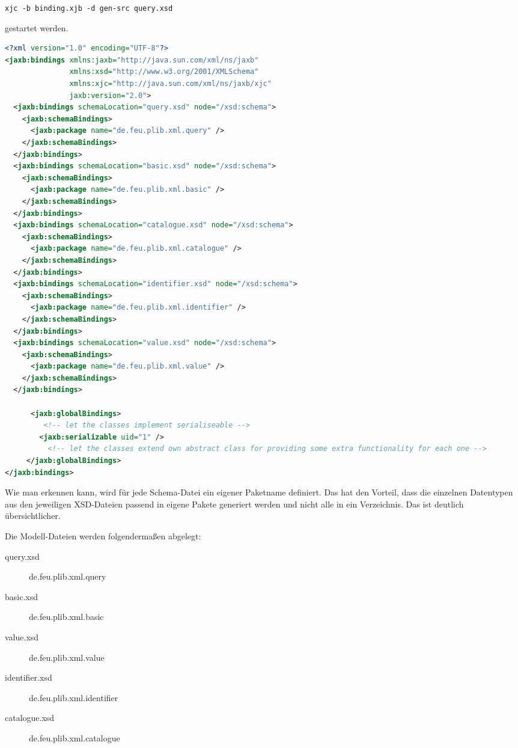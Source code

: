 \lstinline[basicstyle=\ttfamily\small\mdseries]{xjc -b binding.xjb -d gen-src query.xsd}

gestartet werden.  

\begin{lstlisting}[caption=Binding File binding.xjc, language=XML, label=lst:bindingfile]
<?xml version="1.0" encoding="UTF-8"?>
<jaxb:bindings xmlns:jaxb="http://java.sun.com/xml/ns/jaxb"
               xmlns:xsd="http://www.w3.org/2001/XMLSchema"
               xmlns:xjc="http://java.sun.com/xml/ns/jaxb/xjc"
               jaxb:version="2.0">
  <jaxb:bindings schemaLocation="query.xsd" node="/xsd:schema">
    <jaxb:schemaBindings>
      <jaxb:package name="de.feu.plib.xml.query" />
    </jaxb:schemaBindings>
  </jaxb:bindings>
  <jaxb:bindings schemaLocation="basic.xsd" node="/xsd:schema">
    <jaxb:schemaBindings>
      <jaxb:package name="de.feu.plib.xml.basic" />
    </jaxb:schemaBindings>
  </jaxb:bindings>
  <jaxb:bindings schemaLocation="catalogue.xsd" node="/xsd:schema">
    <jaxb:schemaBindings>
      <jaxb:package name="de.feu.plib.xml.catalogue" />
    </jaxb:schemaBindings>
  </jaxb:bindings>
  <jaxb:bindings schemaLocation="identifier.xsd" node="/xsd:schema">
    <jaxb:schemaBindings>
      <jaxb:package name="de.feu.plib.xml.identifier" />
    </jaxb:schemaBindings>
  </jaxb:bindings>
  <jaxb:bindings schemaLocation="value.xsd" node="/xsd:schema">
    <jaxb:schemaBindings>
      <jaxb:package name="de.feu.plib.xml.value" />
    </jaxb:schemaBindings>
  </jaxb:bindings> 
  
      <jaxb:globalBindings>
         <!-- let the classes implement serialiseable -->
        <jaxb:serializable uid="1" />
          <!-- let the classes extend own abstract class for providing some extra functionality for each one -->
     </jaxb:globalBindings>  
</jaxb:bindings> 
\end{lstlisting}

Wie man erkennen kann, wird für jede Schema-Datei ein eigener Paketname definiert. Das hat den Vorteil, dass die einzelnen Datentypen aus den jeweiligen XSD-Dateien passend in eigene Pakete generiert werden und nicht alle in ein Verzeichnis. Das ist deutlich übersichtlicher. 

Die Modell-Dateien werden folgendermaßen abgelegt:
\begin{multicols}{2}
\begin{description}
\item[query.xsd] de.feu.plib.xml.query
\item[basic.xsd] de.feu.plib.xml.basic
\item[value.xsd] de.feu.plib.xml.value
\item[identifier.xsd] de.feu.plib.xml.identifier
\item[catalogue.xsd] de.feu.plib.xml.catalogue
\end{description}
\end{multicols}

